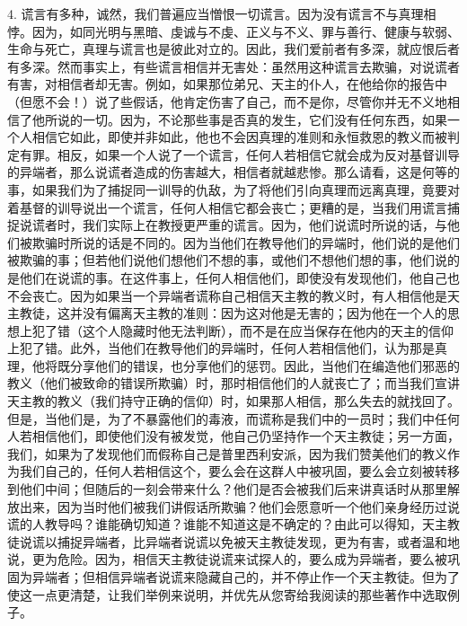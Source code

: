 4. 谎言有多种，诚然，我们普遍应当憎恨一切谎言。因为没有谎言不与真理相悖。因为，如同光明与黑暗、虔诚与不虔、正义与不义、罪与善行、健康与软弱、生命与死亡，真理与谎言也是彼此对立的。因此，我们爱前者有多深，就应恨后者有多深。然而事实上，有些谎言相信并无害处：虽然用这种谎言去欺骗，对说谎者有害，对相信者却无害。例如，如果那位弟兄、天主的仆人，在他给你的报告中（但愿不会！）说了些假话，他肯定伤害了自己，而不是你，尽管你并无不义地相信了他所说的一切。因为，不论那些事是否真的发生，它们没有任何东西，如果一个人相信它如此，即使并非如此，他也不会因真理的准则和永恒救恩的教义而被判定有罪。相反，如果一个人说了一个谎言，任何人若相信它就会成为反对基督训导的异端者，那么说谎者造成的伤害越大，相信者就越悲惨。那么请看，这是何等的事，如果我们为了捕捉同一训导的仇敌，为了将他们引向真理而远离真理，竟要对着基督的训导说出一个谎言，任何人相信它都会丧亡；更糟的是，当我们用谎言捕捉说谎者时，我们实际上在教授更严重的谎言。因为，他们说谎时所说的话，与他们被欺骗时所说的话是不同的。因为当他们在教导他们的异端时，他们说的是他们被欺骗的事；但若他们说他们想他们不想的事，或他们不想他们想的事，他们说的是他们在说谎的事。在这件事上，任何人相信他们，即使没有发现他们，他自己也不会丧亡。因为如果当一个异端者谎称自己相信天主教的教义时，有人相信他是天主教徒，这并没有偏离天主教的准则：因为这对他是无害的；因为他在一个人的思想上犯了错（这个人隐藏时他无法判断），而不是在应当保存在他内的天主的信仰上犯了错。此外，当他们在教导他们的异端时，任何人若相信他们，认为那是真理，他将既分享他们的错误，也分享他们的惩罚。因此，当他们在编造他们邪恶的教义（他们被致命的错误所欺骗）时，那时相信他们的人就丧亡了；而当我们宣讲天主教的教义（我们持守正确的信仰）时，如果那人相信，那么失去的就找回了。但是，当他们是，为了不暴露他们的毒液，而谎称是我们中的一员时；我们中任何人若相信他们，即使他们没有被发觉，他自己仍坚持作一个天主教徒；另一方面，我们，如果为了发现他们而假称自己是普里西利安派，因为我们赞美他们的教义作为我们自己的，任何人若相信这个，要么会在这群人中被巩固，要么会立刻被转移到他们中间；但随后的一刻会带来什么？他们是否会被我们后来讲真话时从那里解放出来，因为当时他们被我们讲假话所欺骗？他们会愿意听一个他们亲身经历过说谎的人教导吗？谁能确切知道？谁能不知道这是不确定的？由此可以得知，天主教徒说谎以捕捉异端者，比异端者说谎以免被天主教徒发现，更为有害，或者温和地说，更为危险。因为，相信天主教徒说谎来试探人的，要么成为异端者，要么被巩固为异端者；但相信异端者说谎来隐藏自己的，并不停止作一个天主教徒。但为了使这一点更清楚，让我们举例来说明，并优先从您寄给我阅读的那些著作中选取例子。\par

